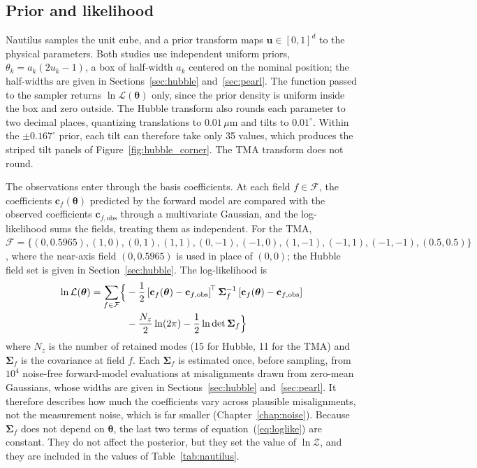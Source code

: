 \subsection{Prior and likelihood}\label{sec:prior_like}
Nautilus samples the unit cube, and a prior transform maps $\mathbf{u}\in[0,1]^d$ to the physical parameters. Both studies use independent uniform priors, $\theta_k=a_k(2u_k-1)$, a box of half-width $a_k$ centered on the nominal position; the half-widths are given in Sections~\ref{sec:hubble} and~\ref{sec:pearl}. The function passed to the sampler returns $\ln\mathcal{L}(\boldsymbol{\theta})$ only, since the prior density is uniform inside the box and zero outside. The Hubble transform also rounds each parameter to two decimal places, quantizing translations to $0.01\,\mu\mathrm{m}$ and tilts to $0.01^{\circ}$. Within the $\pm0.167^{\circ}$ prior, each tilt can therefore take only 35 values, which produces the striped tilt panels of Figure~\ref{fig:hubble_corner}. The TMA transform does not round.

The observations enter through the basis coefficients. At each field $f\in\mathcal{F}$, the coefficients $\mathbf{c}_f(\boldsymbol{\theta})$ predicted by the forward model are compared with the observed coefficients $\mathbf{c}_{f,\mathrm{obs}}$ through a multivariate Gaussian, and the log-likelihood sums the fields, treating them as independent. For the TMA, $\mathcal{F} = \{(0,0.5965),\allowbreak(1,0),\allowbreak(0,1),\allowbreak(1,1),\allowbreak(0,-1),\allowbreak(-1,0),\allowbreak(1,-1),\allowbreak(-1,1),\allowbreak(-1,-1),\allowbreak(0.5,0.5)\}$, where the near-axis field $(0,0.5965)$ is used in place of $(0,0)$; the Hubble field set is given in Section~\ref{sec:hubble}. The log-likelihood is
\begin{equation}
\begin{split}
\ln \mathcal{L}(\boldsymbol{\theta})
= \sum_{f \in \mathcal{F}} \Bigl\{
&-\frac{1}{2}
\left[\mathbf{c}_f(\boldsymbol{\theta}) - \mathbf{c}_{f,\mathrm{obs}}\right]^{\!\top}
\boldsymbol{\Sigma}_f^{-1}
\left[\mathbf{c}_f(\boldsymbol{\theta}) - \mathbf{c}_{f,\mathrm{obs}}\right] \\
&-\frac{N_z}{2}\ln(2\pi)
-\frac{1}{2}\ln\det\boldsymbol{\Sigma}_f
\Bigr\}
\end{split}
\label{eq:loglike}
\end{equation}
where $N_z$ is the number of retained modes (15 for Hubble, 11 for the TMA) and $\boldsymbol{\Sigma}_f$ is the covariance at field $f$. Each $\boldsymbol{\Sigma}_f$ is estimated once, before sampling, from $10^4$ noise-free forward-model evaluations at misalignments drawn from zero-mean Gaussians, whose widths are given in Sections~\ref{sec:hubble} and~\ref{sec:pearl}. It therefore describes how much the coefficients vary across plausible misalignments, not the measurement noise, which is far smaller (Chapter~\ref{chap:noise}). Because $\boldsymbol{\Sigma}_f$ does not depend on $\boldsymbol{\theta}$, the last two terms of equation~(\ref{eq:loglike}) are constant. They do not affect the posterior, but they set the value of $\ln\mathcal{Z}$, and they are included in the values of Table~\ref{tab:nautilus}.

